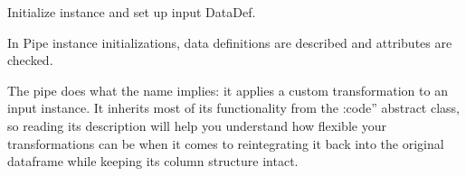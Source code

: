 \documentclass[letterpaper,10pt,english]{sphinxmanual}
\begin{document}
\begin{fulllineitems}
\begin{fulllineitems}
\label{\detokenize{beginners-guide:dalio.pipe.col_generation.Custom.__init__}}
Initialize instance and set up input DataDef.

In Pipe instance initializations, data definitions are described
and attributes are checked.

\end{fulllineitems}


\end{fulllineitems}


The  pipe does what the name implies: it applies a custom transformation to an input  instance. It inherits most of its functionality from the :code” abstract class, so reading its description will help you understand how flexible your transformations can be when it comes to reintegrating it back into the original dataframe while keeping its column structure intact.
\end{document}
